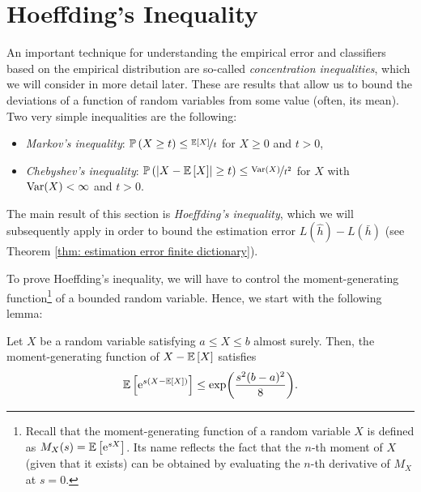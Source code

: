 \section{Hoeffding's Inequality}

An important technique for understanding the empirical error and classifiers based on the empirical distribution are so-called \emph{concentration inequalities}, which we will consider in more detail later. These are results that allow us to bound the deviations of a function of random variables from some value (often, its mean). Two very simple inequalities are the following:

\begin{prop}
\begin{itemize}
    \item \emph{Markov's inequality}: $\mathbb{P}\left(X \geq t\right) \leq \nicefrac{\mathbb{E}\left[X\right]}{t}$ for $X \geq 0$ and $t > 0$,

    \item \emph{Chebyshev’s inequality}: $\mathbb{P}\left(\abs{X - \mathbb{E}\left[X\right]} \geq t\right) \leq \nicefrac{\mathrm{Var}(X)}{t^2}$ for $X$ with $\mathrm{Var}(X) < \infty$ and $t > 0$.
\end{itemize}
\end{prop}

\noindent The main result of this section is \emph{Hoeffding's inequality}, which we will subsequently apply in order to bound the estimation error $L(\hat h) - L(\bar h)$ (see Theorem \ref{thm: estimation error finite dictionary}).

To prove Hoeffding's inequality, we will have to control the moment-generating function\footnote{Recall that the moment-generating function of a random variable $X$ is defined as $M_X(s) = \mathbb{E}\left[\mathrm{e}^{sX}\right]$. Its name reflects the fact that the $n$-th moment of $X$ (given that it exists) can be obtained by evaluating the $n$-th derivative of $M_X$ at $s=0$.} of a bounded random variable. Hence, we start with the following lemma:

\begin{lemma}
\label{lem: hoeffding}
Let $X$ be a random variable satisfying $a \leq X \leq b$ almost surely. Then, 
the moment-generating function of $X - \mathbb{E}\left[X\right]$ satisfies
\[
    \mathbb{E}\left[\mathrm{e}^{s(X - \mathbb{E}\left[X\right])}\right] \leq \exp(\frac{s^2(b-a)^2}{8}).
\]
\end{lemma}

